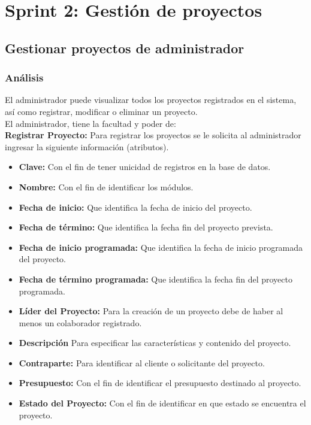 \section{Sprint 2: Gestión de proyectos}
\subsection{Gestionar proyectos de administrador}
\subsubsection {Análisis}
El administrador puede visualizar todos los proyectos registrados en el sistema, así como registrar, modificar o eliminar un proyecto.\\

El administrador, tiene la facultad y poder de:\\

\textbf {Registrar Proyecto:}
Para registrar los proyectos se le solicita al administrador ingresar la siguiente información (atributos).

\begin{itemize}
	\item \textbf{Clave:} Con el fin de tener unicidad de registros en la base de datos.
	\item \textbf{Nombre:} Con el fin de identificar los módulos.
	\item \textbf{Fecha de inicio:} Que identifica la fecha de inicio del proyecto.
	\item \textbf{Fecha de término:} Que identifica la fecha fin del proyecto prevista.
	\item \textbf{Fecha de inicio programada:} Que identifica la fecha de inicio programada del proyecto.
	\item \textbf{Fecha de término programada:} Que identifica la fecha fin del proyecto programada.
	\item \textbf{Líder del Proyecto:} Para la creación de un proyecto debe de haber al menos un colaborador registrado.
	\item \textbf{Descripción} Para especificar las características y contenido del proyecto.
	\item \textbf{Contraparte:} Para identificar al cliente o solicitante del proyecto.
	\item \textbf{Presupuesto:} Con el fin de identificar el presupuesto destinado al proyecto.
	\item \textbf{Estado del Proyecto:} Con el fin de identificar en que estado se encuentra el proyecto.
\end{itemize}

